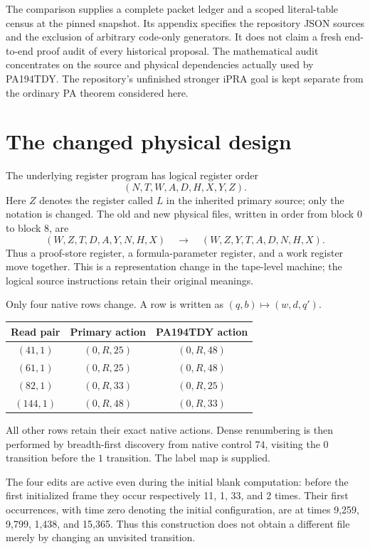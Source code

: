 \documentclass[11pt]{article}
\begin{document}
The comparison supplies a complete packet ledger and a scoped literal-table
census at the pinned snapshot. Its appendix specifies the repository JSON
sources and the exclusion of arbitrary code-only generators. It does not
claim a fresh end-to-end proof audit of every historical
proposal. The mathematical audit concentrates on the source and physical
dependencies actually used by PA194TDY. The repository's unfinished stronger
iPRA goal is kept separate from the ordinary PA theorem considered here.

\section{The changed physical design}

The underlying register program has logical register order
\[
 (N,T,W,A,D,H,X,Y,Z).
\]
Here $Z$ denotes the register called $L$ in the inherited primary source;
only the notation is changed.
The old and new physical files, written in order from block $0$ to block $8$,
are
\[
 (W,Z,T,D,A,Y,N,H,X)
 \quad\longrightarrow\quad
 (W,Z,Y,T,A,D,N,H,X).
\]
Thus a proof-store register, a formula-parameter register, and a work register
move together. This is a representation change in the tape-level machine;
the logical source instructions retain their original meanings.

Only four native rows change. A row is written as
$(q,b)\mapsto(w,d,q')$.
\begin{center}
\begin{tabular}{@{}ccc@{}}
\toprule Read pair & Primary action & PA194TDY action\\\midrule
$(41,1)$ & $(0,R,25)$ & $(0,R,48)$\\
$(61,1)$ & $(0,R,25)$ & $(0,R,48)$\\
$(82,1)$ & $(0,R,33)$ & $(0,R,25)$\\
$(144,1)$ & $(0,R,48)$ & $(0,R,33)$\\
\bottomrule
\end{tabular}
\end{center}
All other rows retain their exact native actions. Dense renumbering is then
performed by breadth-first discovery from native control $74$, visiting the
$0$ transition before the $1$ transition. The label map is supplied.

The four edits are active even during the initial blank computation: before
the first initialized frame they occur respectively 11, 1, 33, and 2 times.
Their first occurrences, with time zero denoting the initial configuration,
are at times 9,259, 9,799, 1,438, and 15,365. Thus this construction does not
obtain a different file merely by changing an unvisited transition.
\end{document}
